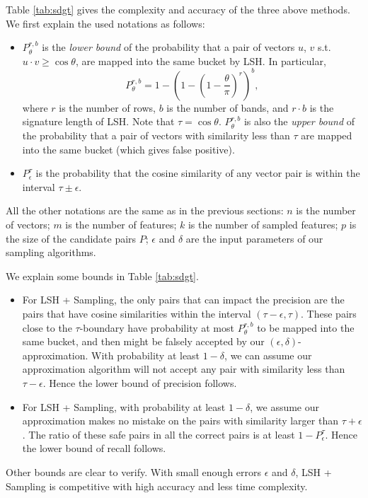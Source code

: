\documentclass{article}
\begin{document}
Table \ref{tab:sdgt} gives the complexity and accuracy of the three above methods. We first explain the used notations as follows:
\begin{itemize}
\item $P_\theta^{r,b}$ is the \emph{lower bound} of the probability that a pair of vectors $u$, $v$ s.t. $u\cdot v \geq \cos\theta$, are mapped into the same bucket by LSH. In particular,
$$P_\theta^{r,b} = 1 - \left(1-\left(1-\frac{\theta}{\pi}\right)^r\right)^b,$$ 
where $r$ is the number of rows, $b$ is the number of bands, and $r\cdot b$ is the signature length of LSH. Note that $\tau = \cos\theta$.
$P_\theta^{r,b}$ is also the \emph{upper bound} of the probability that a pair of vectors with similarity less than $\tau$ are mapped into the same bucket (which gives false positive).
\item $P_\epsilon^\tau$ is the probability that the cosine similarity of any vector pair is within the interval $\tau\pm\epsilon$. 
\end{itemize}
All the other notations are the same as in the previous sections: $n$ is the number of vectors; $m$ is the number of features; $k$ is the number of sampled features; $p$ is the size of the candidate pairs $P$; $\epsilon$ and $\delta$ are the input parameters of our sampling algorithms.

We explain some bounds in Table \ref{tab:sdgt}. 
\begin{itemize}
\item For LSH + Sampling, the only pairs that can impact the precision are the pairs that have cosine similarities within the interval $(\tau-\epsilon,\tau)$. These pairs close to the $\tau$-boundary have probability at most $P_\theta^{r,b}$ to be mapped into the same bucket, and then might be falsely accepted by our $(\epsilon,\delta)$-approximation. With probability at least $1-\delta$, we can assume our approximation algorithm will not accept any pair with similarity less than $\tau-\epsilon$. Hence the lower bound of precision follows. 
\item For LSH + Sampling, with probability at least $1-\delta$, we assume our approximation makes no mistake on the pairs with similarity larger than $\tau+\epsilon$. The ratio of these safe pairs in all the correct pairs is at least $1-P_\epsilon^\tau$. Hence the lower bound of recall follows.
\end{itemize}
Other bounds are clear to verify. With small enough errors $\epsilon$ and $\delta$, LSH + Sampling is competitive with high accuracy and less time complexity.
\end{document}
